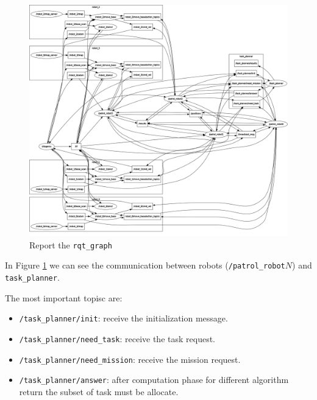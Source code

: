 \begin{figure} [hbt]
    \centering
    \includegraphics[width=\textwidth]{img/rosgraph.png}
    \caption{Report the \texttt{rqt\_graph}}
    \label{fig:rqt_graph}
\end{figure}

In Figure \ref{fig:rqt_graph} we can see the communication between robots (\texttt{/patrol\_robot}$N$) 
and \texttt{task\_planner}.
\newpage

The most important topisc are:
\begin{itemize}
    \item \texttt{/task\_planner/init}: receive the initialization message.
    \item \texttt{/task\_planner/need\_task}: receive the task request.
    \item \texttt{/task\_planner/need\_mission}: receive the mission request.
    \item \texttt{/task\_planner/answer}: after computation phase for different algorithm return the subset of task must be allocate. 
\end{itemize}










